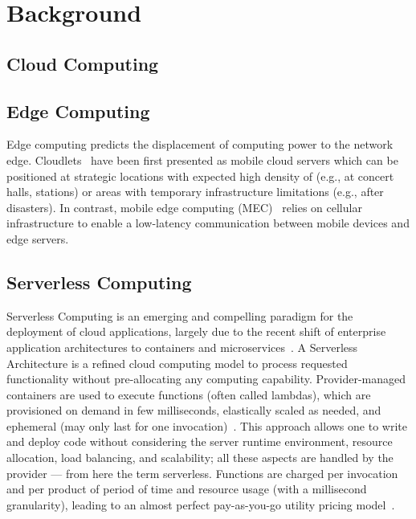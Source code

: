 \section{Background}

\subsection{Cloud Computing}



\subsection{Edge Computing}

Edge computing predicts the displacement of computing power to the network edge. Cloudlets~\cite{CLOUDLETS} have been first presented as mobile cloud servers which can be positioned at strategic locations with expected high density of (e.g., at concert halls, stations) or areas with temporary infrastructure limitations (e.g., after disasters). In contrast, mobile edge computing (MEC)~\cite{MEC} relies on cellular infrastructure to enable a low-latency communication between mobile devices and edge servers. 

\subsection{Serverless Computing}

Serverless Computing is an emerging and compelling paradigm for the deployment of cloud applications, largely due to the recent shift of enterprise application architectures to containers and microservices~\cite{BaldiniServerless17}.  A Serverless Architecture is a refined cloud computing model to process requested functionality without pre-allocating any computing capability. Provider-managed containers are used to execute functions (often called lambdas), which
are provisioned on demand in few milliseconds, elastically scaled as needed, and ephemeral (may only last for one invocation)~\cite{Roberts2016serverless}. This approach allows one to write and deploy code without considering the server runtime
environment, resource allocation, load balancing, and scalability; all these aspects are handled by the provider --- from here the term serverless. Functions are charged per invocation and per product of period of time and resource usage (with a millisecond granularity), leading to an almost perfect pay-as-you-go utility pricing model~\cite{3 MateosFaas}. 

